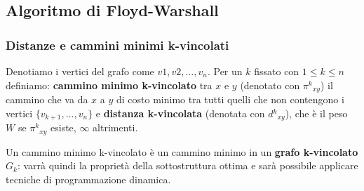 \documentclass[11pt]{article}
\begin{document}
\subsection{Algoritmo di Floyd-Warshall}
\subsubsection{Distanze e cammini minimi k-vincolati}
Denotiamo i vertici del grafo come $v1,v2,\dots,v_n$. Per un $k$ fissato con $1\leq k\leq n$ definiamo: \textbf{cammino 
minimo k-vincolato} tra $x$ e $y$ (denotato con $\pi{^k}_{xy}$) il cammino che va da $x$ a $y$ di costo minimo tra tutti
quelli che non contengono i vertici $\{v_{k+1},\dots,v_n\}$ e \textbf{distanza k-vincolata} (denotata con $d{^k}_{xy}$), 
che è il peso $W$ se $\pi{^k}_{xy}$ esiste, $\infty$ altrimenti.

Un cammino minimo k-vincolato è un cammino minimo in un \textbf{grafo k-vincolato} $G_k$: varrà quindi la proprietà della 
sottostruttura ottima e sarà possibile applicare tecniche di programmazione dinamica.
\end{document}
